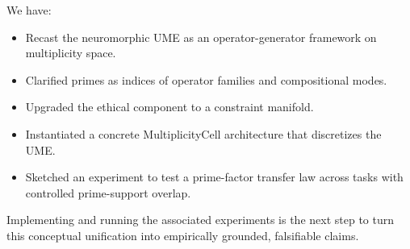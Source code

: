 \documentclass[11pt]{article}
\begin{document}
We have:
\begin{itemize}[nosep]
\item Recast the neuromorphic UME as an operator-generator framework on multiplicity space.
\item Clarified primes as indices of operator families and compositional modes.
\item Upgraded the ethical component to a constraint manifold.
\item Instantiated a concrete MultiplicityCell architecture that discretizes the UME.
\item Sketched an experiment to test a prime-factor transfer law across tasks with controlled prime-support overlap.
\end{itemize}

Implementing and running the associated experiments is the next step to turn this conceptual unification into empirically grounded, falsifiable claims.

\nocite{*}

 
\end{document}
